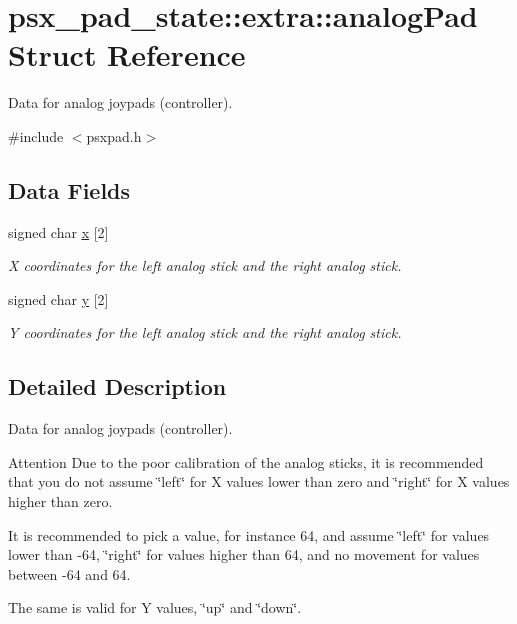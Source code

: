 \hypertarget{structpsx__pad__state_1_1extra_1_1analogPad}{}\section{psx\+\_\+pad\+\_\+state\+:\+:extra\+:\+:analog\+Pad Struct Reference}
\label{structpsx__pad__state_1_1extra_1_1analogPad}


Data for analog joypads (controller).  




{\ttfamily \#include $<$psxpad.\+h$>$}

\subsection*{Data Fields}
\begin{DoxyCompactItemize}
\item 
signed char \hyperlink{structpsx__pad__state_1_1extra_1_1analogPad_a9f1cce7fb30ad35f6b58a3f3219cbdc4}{x} \mbox{[}2\mbox{]}
\begin{DoxyCompactList}\small\item\em X coordinates for the left analog stick and the right analog stick. \end{DoxyCompactList}\item 
signed char \hyperlink{structpsx__pad__state_1_1extra_1_1analogPad_a4c3c2de2ba57dfb45bfc1d0d59a3d14a}{y} \mbox{[}2\mbox{]}
\begin{DoxyCompactList}\small\item\em Y coordinates for the left analog stick and the right analog stick. \end{DoxyCompactList}\end{DoxyCompactItemize}


\subsection{Detailed Description}
Data for analog joypads (controller). 

\begin{DoxyAttention}{Attention}
Due to the poor calibration of the analog sticks, it is recommended that you do not assume \char`\"{}left\char`\"{} for X values lower than zero and \char`\"{}right\char`\"{} for X values higher than zero.

It is recommended to pick a value, for instance 64, and assume \char`\"{}left\char`\"{} for values lower than -\/64, \char`\"{}right\char`\"{} for values higher than 64, and no movement for values between -\/64 and 64.

The same is valid for Y values, \char`\"{}up\char`\"{} and \char`\"{}down\char`\"{}. 
\end{DoxyAttention}


